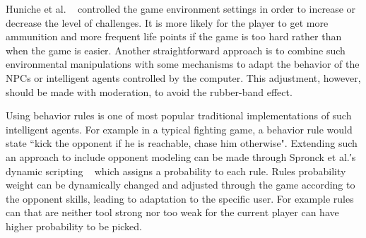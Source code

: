 Huniche et al. ~\cite{hunicke2004ai} controlled the game environment settings in order to increase or decrease the level of challenges. It is more likely for the player to get more ammunition and more frequent life points if the game is too hard rather than when the game is easier. Another straightforward approach is to combine such environmental manipulations with some mechanisms to adapt the behavior of the NPCs or intelligent agents controlled by the computer. This adjustment, however, should be made with moderation, to avoid the rubber-band effect.

Using behavior rules is one of most popular traditional implementations of such intelligent agents. For example in a typical fighting game, a behavior rule would state ``kick the opponent if he is reachable, chase him otherwise". Extending such an approach to include opponent modeling can be made through Spronck et al.′s dynamic scripting ~\cite{spronck2004difficulty} which assigns a probability to each rule. Rules probability weight can be dynamically changed and adjusted through the game according to the opponent skills, leading to adaptation to the specific user. For example rules can that are neither tool strong nor too weak for the current player can have higher probability to be picked.

